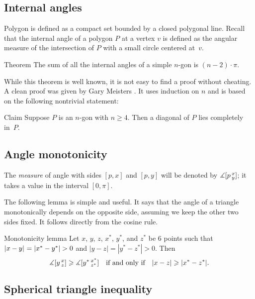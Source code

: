 \subsection*{Internal angles}

Polygon is defined as a compact set bounded by a closed polygonal line. 
Recall that the internal angle of a polygon $P$ at a vertex $v$
is defined as the angular measure of the intersection of $P$ with a small circle centered at~$v$.

\begin{thm}{Theorem}\label{thm:sum=(n-2)pi}
The sum of all the internal angles of a simple $n$-gon is $(n-2)\cdot\pi$. 
\end{thm}

While this theorem is well known, it is not easy to find a proof without cheating.
A clean proof was given by Gary Meisters \cite{meisters}.
It uses induction on $n$ and is based on the following nontrivial statement:

\begin{thm}{Claim}
Suppose $P$ is an $n$-gon with $n\ge 4$.
Then a diagonal of $P$ lies completely in~$P$.
\end{thm}



\subsection*{Angle monotonicity}

The {}\emph{measure} of angle with sides $[p,x]$ and $[p,y]$ will be denoted by $\measuredangle[p\,{}^{x}_{y}]$;
it takes a value in the interval $[0,\pi]$.

The following lemma is simple and useful.
It says that the angle of a triangle monotonically depends on the opposite side, assuming we keep the other two sides fixed.
It follows directly from the cosine rule.

\begin{thm}{Monotonicity lemma}\label{lem:angle-monotonicity}
Let $x$, $y$, $z$, $x^{*}$, $y^{*}$, and $z^{*}$ be 6 points such that $\dist{x}{y}{}\z=|x^{*}-y^{*}|>0$ and $|y-z|=|y^{*}-z^{*}|>0$.
Then 
\[\measuredangle[y\,{}^{x}_{z}]
\geqslant
\measuredangle[y^{*}\,{}^{x^{*}}_{z^{*}}]
\quad\text{if and only if}\quad
|x-z|\geqslant |x^{*}-z^{*}|.\]
\end{thm}

\subsection*{Spherical triangle inequality}

